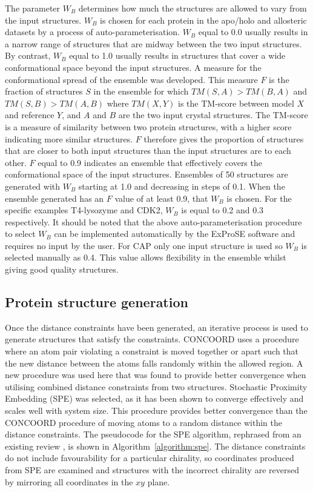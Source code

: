 The parameter $W_{B}$ determines how much the structures are allowed to vary from the input structures.
$W_{B}$ is chosen for each protein in the apo/holo and allosteric datasets by a process of auto-parameterisation.
$W_{B}$ equal to 0.0 usually results in a narrow range of structures that are midway between the two input structures.
By contrast, $W_{B}$ equal to 1.0 usually results in structures that cover a wide conformational space beyond the input structures.
A measure for the conformational spread of the ensemble was developed.
This measure $F$ is the fraction of structures $S$ in the ensemble for which $TM(S,A) > TM(B,A)$ and $TM(S,B) > TM(A,B)$ where $TM(X,Y)$ is the TM-score between model $X$ and reference $Y$, and $A$ and $B$ are the two input crystal structures.
The TM-score is a measure of similarity between two protein structures, with a higher score indicating more similar structures.
$F$ therefore gives the proportion of structures that are closer to both input structures than the input structures are to each other.
$F$ equal to 0.9 indicates an ensemble that effectively covers the conformational space of the input structures.
Ensembles of 50 structures are generated with $W_{B}$ starting at 1.0 and decreasing in steps of 0.1.
When the ensemble generated has an $F$ value of at least 0.9, that $W_{B}$ is chosen.
For the specific examples T4-lysozyme and CDK2, $W_{B}$ is equal to 0.2 and 0.3 respectively.
It should be noted that the above auto-parameterisation procedure to select $W_{B}$ can be implemented automatically by the ExProSE software and requires no input by the user.
For CAP only one input structure is used so $W_{B}$ is selected manually as 0.4.
This value allows flexibility in the ensemble whilst giving good quality structures.


\subsection{Protein structure generation}

Once the distance constraints have been generated, an iterative process is used to generate structures that satisfy the constraints.
CONCOORD uses a procedure where an atom pair violating a constraint is moved together or apart such that the new distance between the atoms falls randomly within the allowed region.
A new procedure was used here that was found to provide better convergence when utilising combined distance constraints from two structures.
Stochastic Proximity Embedding (SPE) \cite{Agrafiotis2013} was selected, as it has been shown to converge effectively and scales well with system size.
This procedure provides better convergence than the CONCOORD procedure of moving atoms to a random distance within the distance constraints.
The pseudocode for the SPE algorithm, rephrased from an existing review \cite{Agrafiotis2013}, is shown in Algorithm~\ref{algorithm:spe}.
The distance constraints do not include favourability for a particular chirality, so coordinates produced from SPE are examined and structures with the incorrect chirality are reversed by mirroring all coordinates in the $xy$ plane.


